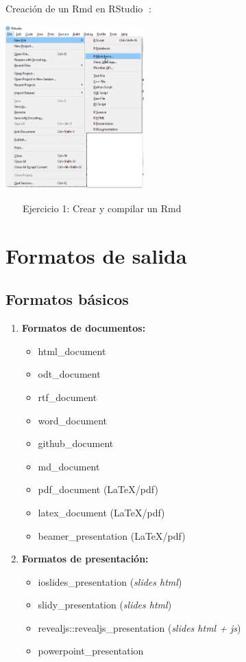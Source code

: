 \documentclass[
]{article}
\providecommand{\tightlist}{%
  \setlength{\itemsep}{0pt}\setlength{\parskip}{0pt}}
\begin{document}
Creación de un Rmd en RStudio 🐣:

\includegraphics[width=0.4\textwidth,height=\textheight]{images/crear_mkd.png}

👩‍💻 👨‍💻 Ejercicio 1: Crear y compilar un Rmd

\hypertarget{formatos-de-salida}{%
\section{Formatos de salida}\label{formatos-de-salida}}

\hypertarget{formatos-buxe1sicos}{%
\subsection{Formatos básicos}\label{formatos-buxe1sicos}}

\begin{enumerate}
\def\labelenumi{\arabic{enumi}.}
\tightlist
\item
  \textbf{Formatos de documentos:}

  \begin{itemize}
  \tightlist
  \item
    html\_document
  \item
    odt\_document
  \item
    rtf\_document
  \item
    word\_document
  \item
    github\_document
  \item
    md\_document
  \item
    pdf\_document (LaTeX/pdf)
  \item
    latex\_document (LaTeX/pdf)
  \item
    beamer\_presentation (LaTeX/pdf)
  \end{itemize}
\item
  \textbf{Formatos de presentación:}

  \begin{itemize}
  \tightlist
  \item
    ioslides\_presentation (\emph{slides html})
  \item
    slidy\_presentation (\emph{slides html})
  \item
    revealjs::revealjs\_presentation (\emph{slides html + js})
  \item
    powerpoint\_presentation
  \end{itemize}
\end{enumerate}
\end{document}
